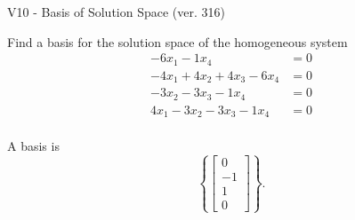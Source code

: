 \begin{exercise}
  \begin{exerciseTitle}V10 - Basis of Solution Space (ver. 316)\end{exerciseTitle}
  \begin{exerciseStatement}
    Find a basis for the solution space of the homogeneous system 
\begin{align*}
 -6 x_ 1 -1 x_ 4 &= 0  \\ 
  -4 x_ 1 + 4 x_ 2 + 4 x_ 3 -6 x_ 4 &= 0  \\ 
  -3 x_ 2 -3 x_ 3 -1 x_ 4 &= 0  \\ 
  4 x_ 1 -3 x_ 2 -3 x_ 3 -1 x_ 4 &= 0  \\ 
 \end{align*}


 
  \end{exerciseStatement}

  \begin{exerciseAnswer}
   A basis is   
\[\left\{\left[\begin{array}{c}
0 \\
-1 \\
1 \\
0
\end{array}\right]\right\}.\]

  


  \end{exerciseAnswer}
\end{exercise}